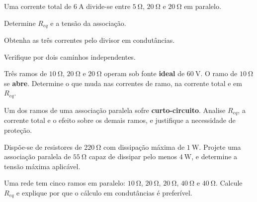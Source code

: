 \blocoaprofundamento
\begin{questao}[3]{}

Uma corrente total de $\SI{6}{\ampere}$ divide-se entre $\SI{5}{\ohm}$,
$\SI{20}{\ohm}$ e $\SI{20}{\ohm}$ em paralelo.
\begin{itensq}
\item Determine $R_{eq}$ e a tensão da associação.
\item Obtenha as três correntes pelo divisor em condutâncias.
\item Verifique por dois caminhos independentes.
\end{itensq}


\end{questao}
\begin{questao}[3]{}

Três ramos de $\SI{10}{\ohm}$, $\SI{20}{\ohm}$ e $\SI{20}{\ohm}$ operam sob
fonte \textbf{ideal} de $\SI{60}{\volt}$. O ramo de $\SI{10}{\ohm}$ se
\textbf{abre}. Determine o que muda nas correntes de ramo, na corrente total e
em $R_{eq}$.


\end{questao}
\begin{questao}[3]{}

Um dos ramos de uma associação paralela sofre \textbf{curto-circuito}. Analise
$R_{eq}$, a corrente total e o efeito sobre os demais ramos, e justifique a
necessidade de proteção.


\end{questao}
\begin{questao}[3]{}

Dispõe-se de resistores de $\SI{220}{\ohm}$ com dissipação máxima de
$\SI{1}{\watt}$. Projete uma associação paralela de $\SI{55}{\ohm}$ capaz de
dissipar pelo menos $\SI{4}{\watt}$, e determine a tensão máxima aplicável.


\end{questao}
\begin{questao}[3]{}

Uma rede tem cinco ramos em paralelo: $\SI{10}{\ohm}$, $\SI{20}{\ohm}$,
$\SI{20}{\ohm}$, $\SI{40}{\ohm}$ e $\SI{40}{\ohm}$. Calcule $R_{eq}$ e explique
por que o cálculo em condutâncias é preferível.


\end{questao}
